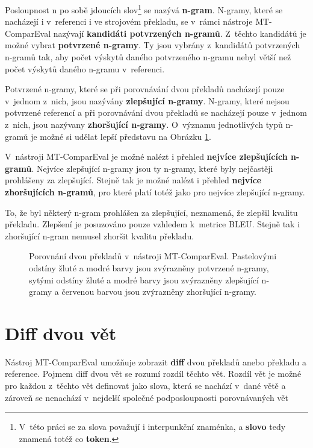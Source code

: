 Posloupnost n po sobě jdoucích slov\footnote{
  V~této práci se za slova považují i interpunkční znaménka, a \textbf{slovo} tedy znamená totéž co \textbf{token}.}
  se nazývá \textbf{\mbox{n-gram}}.
N-gramy,
  které se nacházejí i v~referenci i ve strojovém překladu,
  se v~rámci nástroje \mbox{MT-ComparEval} nazývají \textbf{kandidáti potvrzených \mbox{n-gramů}}.
Z~těchto kandidátů je možné vybrat \textbf{potvrzené \mbox{n-gramy}}.
Ty jsou vybrány z~kandidátů potvrzených \mbox{n-gramů} tak,
  aby počet výskytů daného potvrzeného \mbox{n-gramu} nebyl větší než počet výskytů daného \mbox{n-gramu} v~referenci.

Potvrzené \mbox{n-gramy},
  které se při porovnávání dvou překladů nacházejí pouze v~jednom z~nich,
  jsou nazývány \textbf{zlepšující \mbox{n-gramy}}.
N-gramy,
  které nejsou potvrzené referencí
  a při porovnávání dvou překladů se nacházejí pouze v~jednom z~nich,
  jsou nazývany \textbf{zhoršující \mbox{n-gramy}}.
O~významu jednotlivých typů \mbox{n-gramů} je možné si udělat lepší představu na Obrázku \ref{img:n-grams}.

V~nástroji \mbox{MT-ComparEval} je možné nalézt i přehled \textbf{nejvíce zlepšujících \mbox{n-gramů}}.
Nejvíce zlepšující \mbox{n-gramy} jsou ty \mbox{n-gramy},
  které byly nejčastěji prohlášeny za zlepšující.
Stejně tak je možné nalézt i přehled \textbf{nejvíce zhoršujících \mbox{n-gramů}},
  pro které platí totéž jako pro nejvíce zlepšující \mbox{n-gramy}.

To,
  že byl některý \mbox{n-gram} prohlášen za zlepšující,
  neznamená, že zlepšil kvalitu překladu.
Zlepšení je posuzováno pouze vzhledem k~metrice BLEU.
Stejně tak i zhoršující \mbox{n-gram} nemusel zhoršit kvalitu překladu.

\begin{figure}
	\caption{
		Porovnání dvou překladů v~nástroji \mbox{MT-ComparEval}.
		Pastelovými odstíny žluté a modré barvy jsou zvýrazněny potvrzené \mbox{n-gramy},
		sytými odstíny žluté a modré barvy jsou zvýrazněny zlepšující \mbox{n-gramy}
		a červenou barvou jsou zvýrazněny zhoršující \mbox{n-gramy}.
	}
	\label{img:n-grams}
\end{figure}

\section{Diff dvou vět}
Nástroj \mbox{MT-ComparEval} umožňuje zobrazit \textbf{diff} dvou překladů anebo překladu a reference.
Pojmem diff dvou vět se rozumí rozdíl těchto vět.
Rozdíl vět je možné pro každou z~těchto vět definovat jako slova,
  která se nachází v~dané větě
  a zároveň se nenachází v~nejdelší společné podposloupnosti porovnávaných vět

